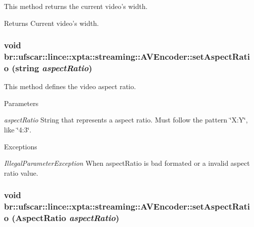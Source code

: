 This method returns the current video's width. 

\begin{DoxyReturn}{Returns}
Current video's width. 
\end{DoxyReturn}
\hypertarget{classbr_1_1ufscar_1_1lince_1_1xpta_1_1streaming_1_1AVEncoder_af84532eb71a0a2fea01d8cac6a4e3915}{
\subsubsection[{setAspectRatio}]{\setlength{\rightskip}{0pt plus 5cm}void br::ufscar::lince::xpta::streaming::AVEncoder::setAspectRatio (string {\em aspectRatio})}}
\label{classbr_1_1ufscar_1_1lince_1_1xpta_1_1streaming_1_1AVEncoder_af84532eb71a0a2fea01d8cac6a4e3915}


This method defines the video aspect ratio. 


\begin{DoxyParams}{Parameters}
\item[{\em aspectRatio}]String that represents a aspect ratio. Must follow the pattern \char`\"{}X:Y\char`\"{}, like \char`\"{}4:3\char`\"{}. \end{DoxyParams}

\begin{DoxyExceptions}{Exceptions}
\item[{\em IllegalParameterException}]When aspectRatio is bad formated or a invalid aspect ratio value. \end{DoxyExceptions}
\hypertarget{classbr_1_1ufscar_1_1lince_1_1xpta_1_1streaming_1_1AVEncoder_a9c9c36be5f81a78a2172d5779893f3b6}{
\subsubsection[{setAspectRatio}]{\setlength{\rightskip}{0pt plus 5cm}void br::ufscar::lince::xpta::streaming::AVEncoder::setAspectRatio ({\bf AspectRatio} {\em aspectRatio})}}
\label{classbr_1_1ufscar_1_1lince_1_1xpta_1_1streaming_1_1AVEncoder_a9c9c36be5f81a78a2172d5779893f3b6}


